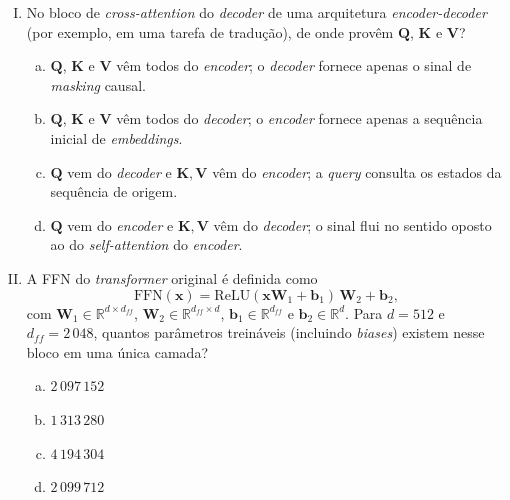 \documentclass{dlproblemset}
\begin{document}
\begin{enumerate}[I)]
\item No bloco de \textit{cross-attention} do \textit{decoder} de uma
      arquitetura \textit{encoder-decoder} (por exemplo, em uma tarefa de
      tradução), de onde provêm $\mathbf{Q}$, $\mathbf{K}$ e $\mathbf{V}$?

\begin{enumerate}[a)]
    \item $\mathbf{Q}$, $\mathbf{K}$ e $\mathbf{V}$ vêm todos do \textit{encoder}; o \textit{decoder}
          fornece apenas o sinal de \textit{masking} causal.
    \item $\mathbf{Q}$, $\mathbf{K}$ e $\mathbf{V}$ vêm todos do \textit{decoder}; o \textit{encoder}
          fornece apenas a sequência inicial de \textit{embeddings}.
    \item $\mathbf{Q}$ vem do \textit{decoder} e $\mathbf{K}, \mathbf{V}$ vêm do \textit{encoder};
          a \textit{query} consulta os estados da sequência de origem.
    \item $\mathbf{Q}$ vem do \textit{encoder} e $\mathbf{K}, \mathbf{V}$ vêm do \textit{decoder};
          o sinal flui no sentido oposto ao do \textit{self-attention}
          do \textit{encoder}.
\end{enumerate}

\item {} A FFN do \textit{transformer} original é
      definida como
      \[
        \mathrm{FFN}(\mathbf{x}) = \mathrm{ReLU}(\mathbf{x} \mathbf{W}_1 + \mathbf{b}_1)\,\mathbf{W}_2 + \mathbf{b}_2,
      \]
      com $\mathbf{W}_1 \in \mathbb{R}^{d \times d_{ff}}$,
      $\mathbf{W}_2 \in \mathbb{R}^{d_{ff} \times d}$,
      $\mathbf{b}_1 \in \mathbb{R}^{d_{ff}}$ e $\mathbf{b}_2 \in \mathbb{R}^{d}$.
      Para $d = 512$ e $d_{ff} = 2\,048$, quantos parâmetros treináveis
      (incluindo \textit{biases}) existem nesse bloco em uma única camada?

\begin{enumerate}[a)]
    \item $2\,097\,152$
    \item $1\,313\,280$
    \item $4\,194\,304$
    \item $2\,099\,712$
\end{enumerate}


\end{enumerate}
\end{document}
